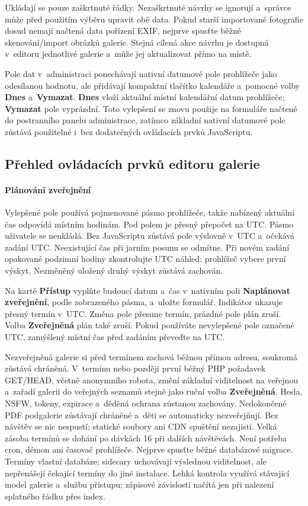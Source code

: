 \documentclass[11pt,a4paper]{article}
\newcommand{\ui}[1]{\textbf{#1}}
\begin{document}
Ukládají se pouze zaškrtnuté řádky. Nezaškrtnuté návrhy se ignorují a~správce
může před použitím výběru upravit obě data. Pokud starší importované fotografie
dosud nemají načtená data pořízení EXIF, nejprve spusťte běžné skenování/import
obrázků galerie. Stejná cílená akce návrhu je dostupná v~editoru jednotlivé
galerie a~může jej aktualizovat přímo na místě.

Pole dat v~administraci ponechávají nativní datumové pole prohlížeče jako
odesílanou hodnotu, ale přidávají kompaktní tlačítko kalendáře a~pomocné volby
\ui{Dnes} a~\ui{Vymazat}. \ui{Dnes} vloží aktuální místní kalendářní datum
prohlížeče; \ui{Vymazat} pole vyprázdní. Toto vylepšení se znovu použije na
formuláře načtené do postranního panelu administrace, zatímco základní nativní
datumové pole zůstává použitelné i~bez dodatečných ovládacích prvků JavaScriptu.

\subsection{Přehled ovládacích prvků editoru galerie}
\paragraph{Plánování zveřejnění}
Vylepšené pole používá pojmenované pásmo prohlížeče, takže nabízený aktuální
čas odpovídá místním hodinám. Pod polem je přesný přepočet na UTC.
Pásmo uživatele se neukládá. Bez JavaScriptu zůstává pole výslovně v~UTC
a~očekává zadání UTC. Neexistující čas při jarním posunu se odmítne.
Při novém zadání opakované podzimní hodiny zkontrolujte UTC náhled:
prohlížeč vybere první výskyt. Nezměněný uložený druhý výskyt zůstává zachován.

Na kartě \ui{Přístup} vyplňte budoucí datum a~čas v~nativním poli
\ui{Naplánovat zveřejnění}, podle zobrazeného pásma, a~uložte formulář.
Indikátor ukazuje přesný termín v~UTC. Změna pole přesune termín,
prázdné pole plán zruší. Volba \ui{Zveřejněná} plán také zruší.
Pokud používáte nevylepšené pole označené UTC, zamýšlený místní čas
před zadáním převeďte na UTC.

Nezveřejněná galerie si před termínem zachová běžnou přímou adresu,
soukromá zůstává chráněná. V~termínu nebo později první běžný PHP požadavek
GET/HEAD, včetně anonymního robota, změní základní viditelnost na
veřejnou a~zařadí galerii do veřejných seznamů stejně jako ruční volba
\ui{Zveřejněná}. Hesla, NSFW, tokeny, expirace a~děděná ochrana zůstanou
zachovány.
Nedokončené PDF podgalerie zůstávají chráněné a~děti se automaticky
nezveřejňují. Bez návštěv se nic nespustí; statické soubory ani CDN
spuštění nezajistí. Velká zásoba termínů se dohání po dávkách 16 při
dalších návštěvách. Není potřeba cron, démon ani časovač prohlížeče.
Nejprve spusťte běžné databázové migrace. Termíny vlastní databáze;
sidecary uchovávají výslednou viditelnost, ale nepřenášejí čekající
termíny do jiné instalace.
Lehká kontrola využívá stávající model galerie a~službu přístupu;
zápisové závislosti načítá jen při nalezení splatného řádku přes index.
\end{document}
